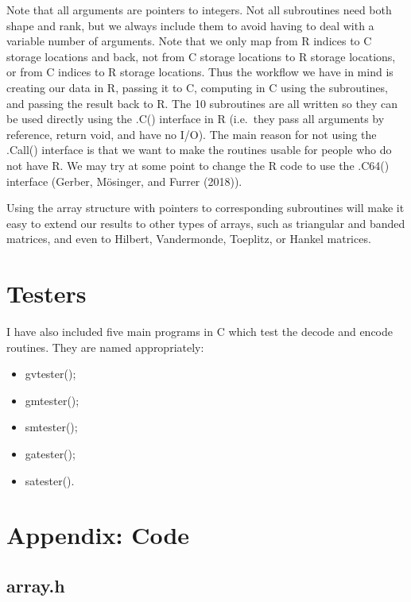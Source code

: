 \documentclass[
  12pt,
]{article}
\providecommand{\tightlist}{%
  \setlength{\itemsep}{0pt}\setlength{\parskip}{0pt}}
\begin{document}
Note that all arguments are pointers to integers. Not all subroutines
need both shape and rank, but we always include them to avoid having to
deal with a variable number of arguments. Note that we only map from R
indices to C storage locations and back, not from C storage locations to
R storage locations, or from C indices to R storage locations. Thus the
workflow we have in mind is creating our data in R, passing it to C,
computing in C using the subroutines, and passing the result back to R.
The 10 subroutines are all written so they can be used directly using
the .C() interface in R (i.e.~they pass all arguments by reference,
return void, and have no I/O). The main reason for not using the .Call()
interface is that we want to make the routines usable for people who do
not have R. We may try at some point to change the R code to use the
.C64() interface (Gerber, Mösinger, and Furrer (2018)).

Using the array structure with pointers to corresponding subroutines
will make it easy to extend our results to other types of arrays, such
as triangular and banded matrices, and even to Hilbert, Vandermonde,
Toeplitz, or Hankel matrices.

\hypertarget{testers}{%
\section{Testers}\label{testers}}

I have also included five main programs in C which test the decode and
encode routines. They are named appropriately:

\begin{itemize}
\tightlist
\item
  gvtester();
\item
  gmtester();
\item
  smtester();
\item
  gatester();
\item
  satester().
\end{itemize}

\hypertarget{appendix-code}{%
\section{Appendix: Code}\label{appendix-code}}

\hypertarget{array.h}{%
\subsection{array.h}\label{array.h}}
\end{document}
